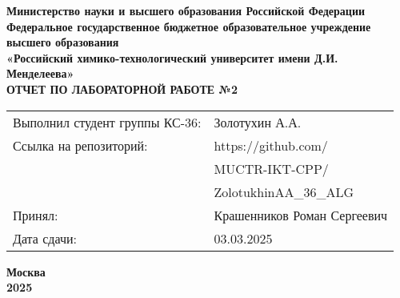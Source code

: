 \documentclass[12pt, a4paper]{report}
\begin{document}
	\begin{titlepage}
		\begin{center}
			\large \textbf{Министерство науки и высшего образования Российской Федерации} \\
			\large \textbf{Федеральное государственное бюджетное образовательное учреждение высшего образования} \\
			\large \textbf{«Российский химико-технологический университет имени Д.И. Менделеева»} \\

			\vspace*{4cm}
			\LARGE \textbf{ОТЧЕТ ПО ЛАБОРАТОРНОЙ РАБОТЕ №2}

			\vspace*{4cm}
			\begin{flushright}
				\Large
				\begin{tabular}{>{\raggedleft\arraybackslash}p{9cm} p{10cm}}
					Выполнил студент группы КС-36: & Золотухин А.А. \\
					Ссылка на репозиторий: & https://github.com/ \\
					& MUCTR-IKT-CPP/ \\
					& ZolotukhinAA\_36\_ALG \\
					Принял: & Крашенников Роман Сергеевич \\
					Дата сдачи: & 03.03.2025 \\
				\end{tabular}
			\end{flushright}

			\vspace*{6cm}
			\Large \textbf{Москва \\ 2025}
		\end{center}
	\end{titlepage}

	\tableofcontents
	\thispagestyle{empty}
	\newpage

\end{document}
